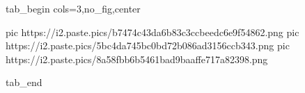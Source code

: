  
 
 
 
 


\ifcmt
  tab_begin cols=3,no_fig,center

     pic https://i2.paste.pics/b7474c43da6b83c3ccbeedc6e9f54862.png
		 pic https://i2.paste.pics/5bc4da745bc0bd72b086ad3156ccb343.png
		 pic https://i2.paste.pics/8a58fbb6b5461bad9baaffe717a82398.png

  tab_end
\fi
